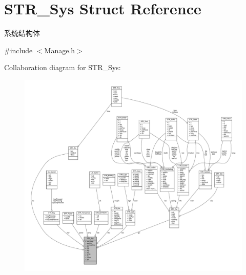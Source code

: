 \hypertarget{struct_s_t_r___sys}{\section{\-S\-T\-R\-\_\-\-Sys \-Struct \-Reference}
\label{struct_s_t_r___sys}
}


系统结构体  




{\ttfamily \#include $<$\-Manage.\-h$>$}



\-Collaboration diagram for \-S\-T\-R\-\_\-\-Sys\-:\nopagebreak
\begin{figure}[H]
\begin{center}
\leavevmode
\includegraphics[width=350pt]{struct_s_t_r___sys__coll__graph}
\end{center}
\end{figure}
